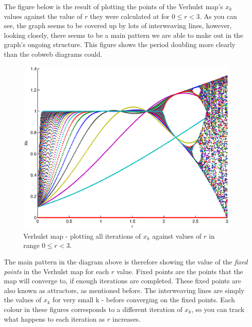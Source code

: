 \documentclass[a4wide, 10pt]{article}
\begin{document}
The figure below is the result of plotting the points of the Verhulst map's $x_{k}$ values
 against the value of $r$ they were calculated at for $ 0 \leq r < 3 $. As you can see,  
  the graph seems to be covered up by lots of interweaving lines, however, looking closely,
   there seems to be a main pattern we are able to make out in the graph's ongoing structure.
    This figure shows the period doubling more clearly than the cobweb diagrams could.

\begin{figure}[H]

    \centering

    \includegraphics[scale=0.3]{EPSFiles/VerhulstAllXk}

    \caption{Verhulst map - plotting all iterations of $x_{k}$ against values of $r$ in range $0 \leq r < 3$.}
    \label{fig:VerhulstAllXk}

\end{figure}

The main pattern in the diagram above is therefore showing the value of the \emph{fixed points} in the
 Verhulst map for each $r$ value. Fixed points are the points that the map will converge to, if
  enough iterations are completed. These fixed points are also known
   as attractors, as mentioned before. The interweaving lines are simply the values of $x_{k}$ for
    very small k - before converging on the fixed points. Each colour in these figures corresponds to 
     a different iteration of $x_{k}$, so you can track what happens to each iteration as $r$ increases.
\end{document}
